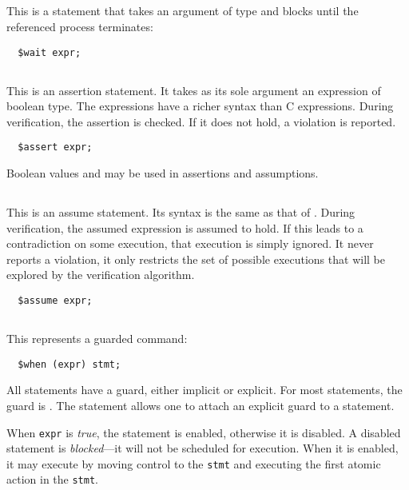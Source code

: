 \documentclass[11pt]{book}
\begin{document}
\subsection{\cwait} This is a statement that takes an argument of type
\cproc{} and blocks until the referenced process terminates:
\begin{verbatim}
  $wait expr;
\end{verbatim}

\subsection{\cassert} This is an assertion statement.  It takes as its
sole argument an expression of boolean type.  The expressions have a
richer syntax than C expressions.  During verification, the assertion
is checked.  If it does not hold, a violation is reported.
\begin{verbatim}
  $assert expr;
\end{verbatim}
Boolean values \ctrue{} and \cfalse{} may be used in assertions
and assumptions.

\subsection{\cassume} This is an assume statement. Its syntax is the
same as that of \cassert.  During verification, the assumed expression
is assumed to hold.  If this leads to a contradiction on some
execution, that execution is simply ignored.  It never reports a
violation, it only restricts the set of possible executions that will
be explored by the verification algorithm.
\begin{verbatim}
  $assume expr;
\end{verbatim}

\subsection{\cwhen} This represents a guarded command:
\begin{verbatim}
  $when (expr) stmt;
\end{verbatim}
All statements have a guard, either implicit or explicit.  For most
statements, the guard is \ctrue.  The \cwhen{} statement allows one to
attach an explicit guard to a statement.

When \texttt{expr} is \emph{true}, the statement is enabled, otherwise
it is disabled.  A disabled statement is \emph{blocked}---it will not
be scheduled for execution.  When it is enabled, it may execute by
moving control to the \texttt{stmt} and executing the first atomic
action in the \texttt{stmt}.
\end{document}
